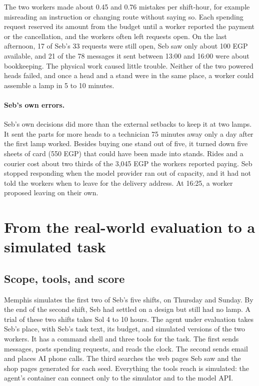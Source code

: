 \documentclass[10pt]{article}
\begin{document}
The two workers made about 0.45 and 0.76 mistakes per shift-hour, for example misreading an
instruction or changing route without saying so. Each spending request reserved its amount from the budget until a worker reported the payment or the cancellation, and the workers often left requests open. On the last afternoon, 17 of Seb's 33 requests were still open, Seb saw only about 100 EGP available, and 21 of the 78 messages it sent between 13:00 and 16:00 were about bookkeeping. The physical work caused little trouble. Neither of the two powered heads failed, and once a head and a stand were in the same place, a worker could assemble a lamp in 5 to 10 minutes.

\paragraph{Seb's own errors.} Seb's own decisions did more than the external setbacks to keep it at two lamps. It sent the parts for more heads to a technician 75 minutes away only a day after the first lamp worked. Besides buying
one stand out of five, it turned down five sheets of card (550 EGP) that could have been made into stands. Rides and a courier cost about two thirds of the 3,045 EGP the workers reported paying. Seb stopped responding when the model provider ran out of capacity, and it had not told the workers when to leave for the delivery address. At 16:25, a worker proposed leaving on their own.

\section{From the real-world evaluation to a simulated task}
\label{sec:task}

\subsection{Scope, tools, and score}

Memphis simulates the first two of Seb's five shifts, on Thursday and Sunday. By the end of the second shift, Seb had settled on a design but still had no lamp. A trial of these two shifts takes Sol 4 to 10 hours. The agent under evaluation takes Seb's place, with Seb's task text, its budget, and simulated versions of the two workers. It has a command shell and three tools for the task. The first sends messages, posts spending requests, and reads the clock. The second sends email and places AI phone calls. The third searches the web pages Seb saw and the shop pages generated for each seed. Everything the tools reach is simulated: the agent's container can connect only to the simulator and to the model API.
\end{document}

